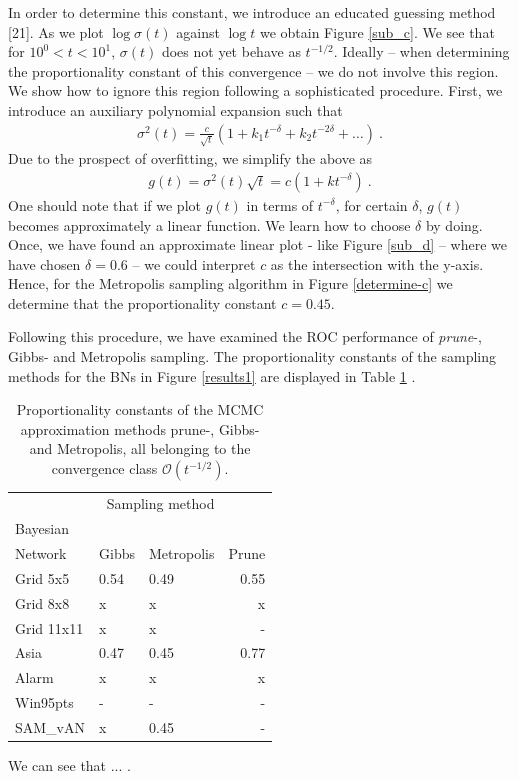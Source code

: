 \documentclass[a4paper, twoside, 11pt]{report}
\theoremstyle{plain}
\theoremstyle{definition}
\theoremstyle{remark}
\begin{document}
In order to determine this constant, we introduce an educated guessing method [21]. As we plot $\log \sigma(t)$ against $\log t$ we obtain Figure \ref{sub_c}. We see that for $10^0 < t < 10^1$, $\sigma(t)$ does not yet behave as $t^{-1/2}$. Ideally -- when determining the proportionality constant of this convergence -- we do not involve this region. We show how to ignore this region following a sophisticated procedure. First, we introduce an auxiliary polynomial expansion such that
\begin{align*}
{\sigma}^2(t) = \frac{c}{\sqrt{t}}(1+k_1 t^{-\delta} + k_2 t^{-2\delta} + \ldots )\ .
\end{align*}
Due to the prospect of overfitting, we simplify the above as
\begin{align*}
g(t) = {\sigma}^2(t) \sqrt{t} = c(1+k t^{-\delta})\ .
\end{align*}
One should note that if we plot $g(t)$ in terms of $t^{-\delta}$, for certain $\delta$, $g(t)$ becomes approximately a linear function. We learn how to choose $\delta$ by doing. Once, we have found an approximate linear plot - like Figure \ref{sub_d} -- where we have chosen $\delta = 0.6$ -- we could interpret $c$ as the intersection with the y-axis. Hence, for the Metropolis sampling algorithm in Figure \ref{determine-c} we determine that the proportionality constant $c = 0.45 $.

Following this procedure, we have examined the ROC performance of \textit{prune}-, Gibbs- and Metropolis sampling. The proportionality constants of the sampling methods for the BNs in Figure \ref{results1} are displayed in Table \ref{ROC-table} .

\vspace{-1pc}
\begin{center}
\begin{table}[h]
\begin{center}
\begin{tabular}{lllr}  
\toprule
\multicolumn{3}{r}{Sampling method} \\
\cmidrule(r){2-4}
Bayesian \\ Network    & Gibbs    & Metropolis & Prune \\
\midrule
Grid 5x5 & 0.54 & 0.49 & 0.55 \\
Grid 8x8 & x & x & x \\
Grid 11x11 & x & x & - \\
Asia & 0.47 & 0.45 & 0.77 \\
Alarm & x & x & x \\
Win95pts & - & - & - \\
SAM\_vAN & x & 0.45 & - \\
\bottomrule
\end{tabular}
\caption{Proportionality constants of the MCMC approximation methods prune-, Gibbs- and Metropolis, all belonging to the convergence class $\mathcal{O}(t^{-1/2})$.}
\label{ROC-table}
\end{center}
\end{table}
\end{center}
We can see that ... .
\end{document}
